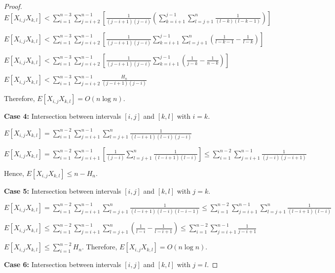 \documentclass[12pt,letterpaper]{article}
\begin{document}
\begin{proof}
$E[X_{i,j} X_{k,l}] < \sum\limits_{i=1}^{n-3} \sum\limits_{j=i+2}^{n-1}
\left[ \frac{1}{(j-i+1)(j-i)}  \left( \sum\limits_{k=i+1}^{j-1} \sum\limits_{l=j+1}^{n} \frac{1}{(l-k)(l-k-1)} \right) \right]$

$E[X_{i,j} X_{k,l}] < \sum\limits_{i=1}^{n-3} \sum\limits_{j=i+2}^{n-1}
\left[ \frac{1}{(j-i+1)(j-i)}  \sum\limits_{k=i+1}^{j-1} \sum\limits_{l=j+1}^{n}  \left(  \frac{1}{l-k-1} - \frac{1}{l-k}  \right) \right]$

$E[X_{i,j} X_{k,l}] < \sum\limits_{i=1}^{n-3} \sum\limits_{j=i+2}^{n-1}
\left[ \frac{1}{(j-i+1)(j-i)}  \sum\limits_{k=i+1}^{j-1}  \left(  \frac{1}{j-k} - \frac{1}{n-k}  \right) \right]$

$E[X_{i,j} X_{k,l}] < \sum\limits_{i=1}^{n-3} \sum\limits_{j=i+2}^{n-1}
\frac{H_{n}}{(j-i+1)(j-i)} $

Therefore, $E[X_{i,j} X_{k,l}] = O(n \log n)$.

\vspace{0.5cm}

{\bf Case 4:} Intersection between intervals $[i, j]$ and $[k, l]$ with $i = k$.

$E[X_{i,j} X_{k,l}] = \sum\limits_{i=1}^{n-2}
\sum\limits_{j=i+1}^{n-1} \sum\limits_{l=j+1}^{n} \frac{1}{(l-i+1)(l-i)(j-i)}$

$E[X_{i,j} X_{k,l}] = \sum\limits_{i=1}^{n-2}
\sum\limits_{j=i+1}^{n-1} \left[ \frac{1}{(j-i)} \sum\limits_{l=j+1}^{n} \frac{1}{(l-i+1)(l-i)} \right]
\leq \sum\limits_{i=1}^{n-2}
\sum\limits_{j=i+1}^{n-1} \frac{1}{(j-i)(j-i+1)}$

Hence, $E[X_{i,j} X_{k,l}] \leq n - H_{n}$.

\vspace{0.5cm}

{\bf Case 5:} Intersection between intervals $[i, j]$ and $[k, l]$ with $j = k$.

$E[X_{i,j} X_{k,l}] = \sum\limits_{i=1}^{n-2}
\sum\limits_{j=i+1}^{n-1} \sum\limits_{l=j+1}^{n} \frac{1}{(l-i+1)(l-i)(l-i-1)}
\leq \sum\limits_{i=1}^{n-2}
\sum\limits_{j=i+1}^{n-1} \sum\limits_{l=j+1}^{n} \frac{1}{(l-i+1)(l-i)}
$

$E[X_{i,j} X_{k,l}] \leq \sum\limits_{i=1}^{n-2}
\sum\limits_{j=i+1}^{n-1} \sum\limits_{l=j+1}^{n} \left( \frac{1}{l-i} - \frac{1}{l-i+1} \right)
\leq \sum\limits_{i=1}^{n-2}
\sum\limits_{j=i+1}^{n-1} \frac{1}{j-i+1}
$

$E[X_{i,j} X_{k,l}] \leq \sum\limits_{i=1}^{n-2} H_{n}$. Therefore, $E[X_{i,j} X_{k,l}] = O(n \log n)$.


{\bf Case 6:} Intersection between intervals $[i, j]$ and $[k, l]$ with $j = l$.


\end{proof}
\end{document}
